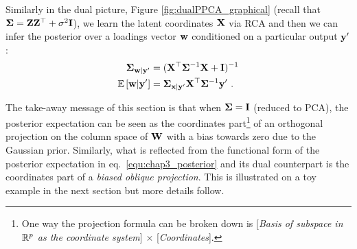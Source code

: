      Similarly in the dual picture, Figure \ref{fig:dualPPCA_graphical} (recall that $\mathbf{\Sigma} = \mathbf{Z}\mathbf{Z}^\top + \sigma^2\mathbf{I}$), we learn the latent coordinates $\mathbf{X}$ via RCA and then we can infer the posterior over a loadings vector $\mathbf{w}$ conditioned on a particular output $\mathbf{y}^{\prime}$:
      \begin{equation*}
	\begin{split}
	  \mathbf{\Sigma}_{\mathbf{w}|\mathbf{y}^\prime} &= (\mathbf{X}^\top \mathbf{\Sigma}^{-1} \mathbf{X} + \mathbf{I})^{-1} \\
	  \mathbb{E}\left[\mathbf{w}|\mathbf{y}^\prime\right] &=  \mathbf{\Sigma}_{\mathbf{x}|\mathbf{y}^\prime} \mathbf{X}^\top\mathbf{\Sigma}^{-1}\mathbf{y}^\prime ~.
	\end{split}
      \end{equation*}

      The take-away message of this section is that when $\mathbf{\Sigma} = \mathbf{I}$ (reduced to PCA), the posterior expectation can be seen as the coordinates part\footnote{One way the projection formula can be broken down is [\emph{Basis of subspace in $\mathbb{R}^{p}$ as the coordinate system}] $\times$ [\emph{Coordinates}].} of an orthogonal projection on the column space of $\mathbf{W}$ with a bias towards zero due to the Gaussian prior. Similarly, what is reflected from the functional form of the posterior expectation in eq.~\eqref{equ:chap3_posterior} and its dual counterpart is the coordinates part of a \textit{biased oblique projection}. This is illustrated on a toy example in the next section but more details follow.
      
